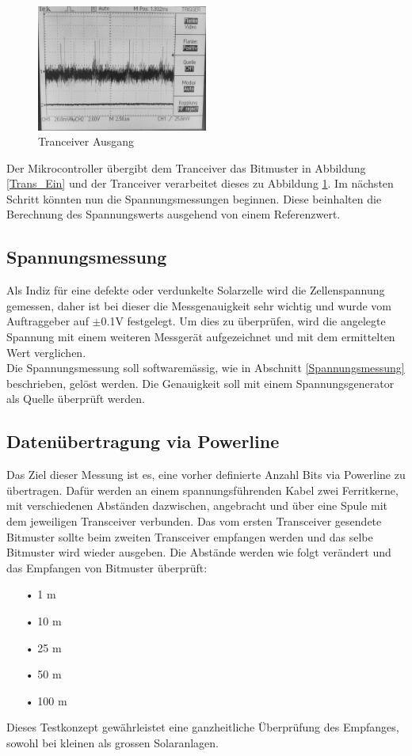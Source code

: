 \begin{figure}[htb]
\centering
\includegraphics[width=0.5\textwidth]{sections/data/singalbilder4.jpg}
\caption{Tranceiver Ausgang}
\label{Trans_Aus}
\end{figure}

Der Mikrocontroller übergibt dem Tranceiver das Bitmuster in Abbildung \ref{Trans_Ein} und der Tranceiver verarbeitet dieses zu Abbildung \ref{Trans_Aus}. Im nächsten Schritt könnten nun die Spannungsmessungen beginnen. Diese beinhalten die Berechnung des Spannungswerts ausgehend von einem Referenzwert. 

\subsection{Spannungsmessung}
Als Indiz für eine defekte oder verdunkelte Solarzelle wird die Zellenspannung gemessen, daher ist bei dieser die Messgenauigkeit sehr wichtig und wurde vom Auftraggeber auf $\pm$0.1V festgelegt. Um dies zu überprüfen, wird die angelegte Spannung mit einem weiteren Messgerät aufgezeichnet und mit dem ermittelten Wert verglichen. \\
Die Spannungsmessung soll softwaremässig, wie in Abschnitt \ref{Spannungsmessung} beschrieben, gelöst werden. Die Genauigkeit soll mit einem Spannungsgenerator als Quelle überprüft werden. 
\subsection{Datenübertragung via Powerline}
Das Ziel dieser Messung ist es, eine vorher definierte Anzahl Bits via Powerline zu übertragen. Dafür werden an einem spannungsführenden Kabel zwei Ferritkerne, mit verschiedenen Abständen dazwischen, angebracht und über eine Spule mit dem jeweiligen Transceiver verbunden. Das vom ersten Transceiver gesendete Bitmuster sollte beim zweiten Transceiver empfangen werden und das selbe Bitmuster wird wieder ausgeben.
Die Abstände werden wie folgt verändert und das Empfangen von Bitmuster überprüft:
\begin{enumerate}
\item[•]1 m
\item[•]10 m
\item[•]25 m
\item[•]50 m
\item[•]100 m
\end{enumerate}
Dieses Testkonzept gewährleistet eine ganzheitliche Überprüfung des Empfanges, sowohl bei kleinen als grossen Solaranlagen.
